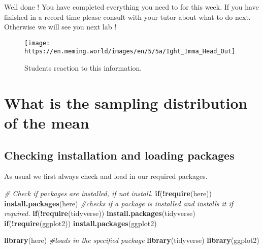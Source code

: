 \documentclass[
]{book}
\newenvironment{Shaded}{\begin{snugshade}}{\end{snugshade}}
\newcommand{\CommentTok}[1]{\textcolor[rgb]{0.56,0.35,0.01}{\textit{#1}}}
\newcommand{\ControlFlowTok}[1]{\textcolor[rgb]{0.13,0.29,0.53}{\textbf{#1}}}
\newcommand{\FunctionTok}[1]{\textcolor[rgb]{0.13,0.29,0.53}{\textbf{#1}}}
\newcommand{\NormalTok}[1]{#1}
\newcommand{\SpecialCharTok}[1]{\textcolor[rgb]{0.81,0.36,0.00}{\textbf{#1}}}
\newcommand{\StringTok}[1]{\textcolor[rgb]{0.31,0.60,0.02}{#1}}
\begin{document}
Well done ! You have completed everything you need to for this week. If you have finished in a record time please consult with your tutor about what to do next. Otherwise we will see you next lab !

\begin{figure}

{\centering \texttt{[image: https://en.meming.world/images/en/5/5a/Ight\_Imma\_Head\_Out]} 

}

\caption{Students reaction to this information.}\label{fig:unnamed-chunk-26}
\end{figure}

\chapter{What is the sampling distribution of the mean}\label{what-is-the-sampling-distribution-of-the-mean}

\section{Checking installation and loading packages}\label{checking-installation-and-loading-packages-1}

As usual we first always check and load in our required packages.

\begin{Shaded}
\begin{Highlighting}[]
\CommentTok{\# Check if packages are installed, if not install.}
\ControlFlowTok{if}\NormalTok{(}\SpecialCharTok{!}\FunctionTok{require}\NormalTok{(here)) }\FunctionTok{install.packages}\NormalTok{(}\StringTok{\textquotesingle{}here\textquotesingle{}}\NormalTok{) }\CommentTok{\#checks if a package is installed and installs it if required.}
\ControlFlowTok{if}\NormalTok{(}\SpecialCharTok{!}\FunctionTok{require}\NormalTok{(tidyverse)) }\FunctionTok{install.packages}\NormalTok{(}\StringTok{\textquotesingle{}tidyverse\textquotesingle{}}\NormalTok{)}
\ControlFlowTok{if}\NormalTok{(}\SpecialCharTok{!}\FunctionTok{require}\NormalTok{(ggplot2)) }\FunctionTok{install.packages}\NormalTok{(}\StringTok{\textquotesingle{}ggplot2\textquotesingle{}}\NormalTok{)}

\FunctionTok{library}\NormalTok{(here) }\CommentTok{\#loads in the specified package}
\FunctionTok{library}\NormalTok{(tidyverse)}
\FunctionTok{library}\NormalTok{(ggplot2)}
\end{Highlighting}
\end{Shaded}
\end{document}
